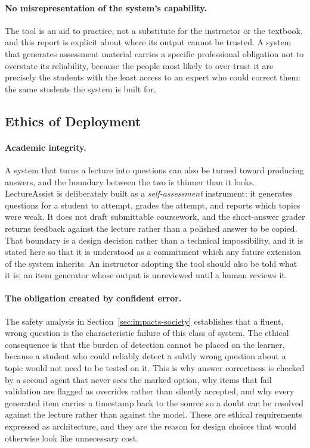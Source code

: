 \paragraph{No misrepresentation of the system's capability.} The tool is an
aid to practice, not a substitute for the instructor or the textbook, and this
report is explicit about where its output cannot be trusted. A system that
generates assessment material carries a specific professional obligation not
to overstate its reliability, because the people most likely to over-trust it
are precisely the students with the least access to an expert who could
correct them: the same students the system is built for.

\subsection{Ethics of Deployment}

\paragraph{Academic integrity.} A system that turns a lecture into questions can
also be turned toward producing answers, and the boundary between the two is
thinner than it looks. LectureAssist is deliberately built as a
\emph{self-assessment} instrument: it generates questions for a student to
attempt, grades the attempt, and reports which topics were weak. It does not
draft submittable coursework, and the short-answer grader returns feedback
against the lecture rather than a polished answer to be copied. That boundary is
a design decision rather than a technical impossibility, and it is stated here so
that it is understood as a commitment which any future extension of the system
inherits. An instructor adopting the tool should also be told what it is: an
item generator whose output is unreviewed until a human reviews it.

\paragraph{The obligation created by confident error.} The safety analysis in
Section~\ref{sec:impacts-society} establishes that a fluent, wrong question is
the characteristic failure of this class of system. The ethical consequence is
that the burden of detection cannot be placed on the learner, because a student
who could reliably detect a subtly wrong question about a topic would not need
to be tested on it. This is why answer correctness is checked by a second agent
that never sees the marked option, why items that fail validation are flagged as
overrides rather than silently accepted, and why every generated item carries a
timestamp back to the source so a doubt can be resolved against the lecture
rather than against the model. These are ethical requirements expressed as
architecture, and they are the reason for design choices that would otherwise
look like unnecessary cost.

